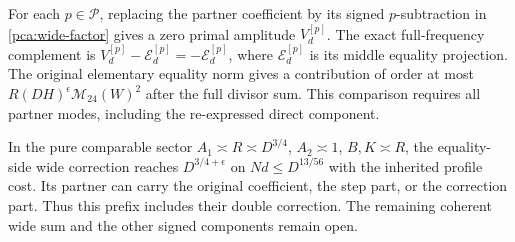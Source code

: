 For each \(p\in\mathcal P\), replacing the partner coefficient
by its signed \(p\)-subtraction in \eqref{pca:wide-factor}
gives a zero primal amplitude \(V_d^{[p]}\).
The exact full-frequency complement is
\(V_d^{[p]}-\mathcal E_d^{[p]}=-\mathcal E_d^{[p]}\), where
\(\mathcal E_d^{[p]}\) is its middle equality projection.
The original elementary equality norm gives a contribution
of order at most \(R(DH)^\epsilon\mathcal M_{24}(W)^2\)
after the full divisor sum. This comparison requires all
partner modes, including the re-expressed direct component.

In the pure comparable sector \(A_1\asymp R\asymp D^{3/4}\),
\(A_2\asymp1\), \(B,K\asymp R\), the equality-side
wide correction reaches \(D^{3/4+\epsilon}\) on
\(Nd\le D^{13/56}\) with the inherited profile cost. Its
partner can carry the original coefficient, the step part,
or the correction part. Thus this prefix includes their
double correction. The remaining coherent wide sum and the
other signed components remain open.
